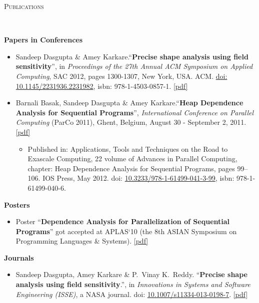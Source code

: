 \documentclass[9pt]{article}
\newenvironment{changemargin}[2]{%
  \begin{list}{}{%
    \setlength{\topsep}{0pt}%
    \setlength{\leftmargin}{#1}%
    \setlength{\rightmargin}{#2}%
    \setlength{\listparindent}{\parindent}%
    \setlength{\itemindent}{\parindent}%
    \setlength{\parsep}{\parskip}%
  }%
  \item[]}{\end{list}
}
\newcommand{\lineover}{
	\begin{changemargin}{-0.05in}{-0.05in}
		\vspace*{-8pt}
		\hrulefill \\
		\vspace*{-2pt}
	\end{changemargin}
}
\newcommand{\header}[1]{
	\begin{changemargin}{-0.5in}{-0.5in}
		\scshape{#1}\\
  	\lineover
	\end{changemargin}
}
\newenvironment{body} {
	\vspace*{-16pt}
	\begin{changemargin}{-0.25in}{-0.5in}
  }	
	{\end{changemargin}
}
\begin{document}
\smallskip

\header{Publications}
\begin{body}
\vspace{14pt}
\textbf{Papers in Conferences}\\
	\vspace*{-4pt}
	\begin{itemize} \itemsep -0pt
		\item Sandeep Dasgupta \& Amey Karkare.``\textbf{Precise shape analysis using field sensitivity}'', in \emph{Proceedings of the 27th Annual ACM Symposium on Applied Computing}, SAC 2012, pages 1300-1307, New York, USA. ACM. \href{http://dx.doi.org/10.1145/2245276.2231982}{doi: 10.1145/2231936.2231982}, isbn: 978-1-4503-0857-1. \href{https://dl.dropbox.com/u/86719354/sac\_2012.pdf}{[pdf]}\\

		\item Barnali Basak, Sandeep Dasgupta \& Amey Karkare.``\textbf{Heap Dependence Analysis for Sequential Programs}'', \emph{International Conference on Parallel Computing} (ParCo 2011), Ghent, Belgium, August 30 - September 2, 2011. \href{https://dl.dropbox.com/u/86719354/parco\_2011.pdf}{[pdf]} \\
		\begin{itemize} \itemsep -0pt
			\item Published in: Applications, Tools and Techniques on the Road to Exascale Computing, 22 volume of Advances in 
				Parallel Computing, chapter: Heap Dependence Analysis for Sequential Programs, pages 99--106. IOS Press, May 2012. 
				doi: \href{http://dx.doi.org/10.3233/978-1-61499-041-3-99}{10.3233/978-1-61499-041-3-99}, isbn: 978-1-61499-040-6.
		\end{itemize}
	\end{itemize}

\textbf{Posters}\\
	\vspace*{-4pt}
	\begin{itemize} \itemsep -0pt
		\item Poster ``\textbf{Dependence Analysis for Parallelization 
		of Sequential Programs}'' got accepted at APLAS`10 (the 8th ASIAN Symposium on Programming Languages \& Systems). \href{https://dl.dropbox.com/u/86719354/poster_APLAS2010.pdf}{[pdf]}
	\end{itemize}

\textbf{Journals}\\
	\vspace{-4pt}
	\begin{itemize} \itemsep -0pt
		\item  Sandeep Dasgupta, Amey Karkare \& P.\ Vinay K.\ Reddy. ``\textbf{Precise shape analysis using field sensitivity}.'', in \emph{Innovations in Systems and Software Engineering (ISSE)}, a NASA journal.
                 doi: \href{http://www.springerlink.com/openurl.asp?genre=article&id=doi:10.1007/s11334-013-0198-7}{10.1007/s11334-013-0198-7}. \href{https://dl.dropbox.com/u/86719354/publication_isse.pdf}{[pdf]}
	\end{itemize}
\end{body}
\end{document}
